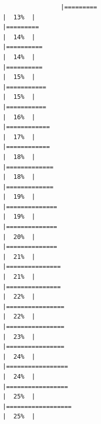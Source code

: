 \documentclass[
]{article}
\begin{document}
\begin{verbatim}
                |=========                                                             |  13%  |                                                                              |=========                                                             |  14%  |                                                                              |==========                                                            |  14%  |                                                                              |==========                                                            |  15%  |                                                                              |===========                                                           |  15%  |                                                                              |===========                                                           |  16%  |                                                                              |============                                                          |  17%  |                                                                              |============                                                          |  18%  |                                                                              |=============                                                         |  18%  |                                                                              |=============                                                         |  19%  |                                                                              |==============                                                        |  19%  |                                                                              |==============                                                        |  20%  |                                                                              |==============                                                        |  21%  |                                                                              |===============                                                       |  21%  |                                                                              |===============                                                       |  22%  |                                                                              |================                                                      |  22%  |                                                                              |================                                                      |  23%  |                                                                              |================                                                      |  24%  |                                                                              |=================                                                     |  24%  |                                                                              |=================                                                     |  25%  |                                                                              |==================                                                    |  25%  |                                                               
\end{verbatim}
\end{document}
